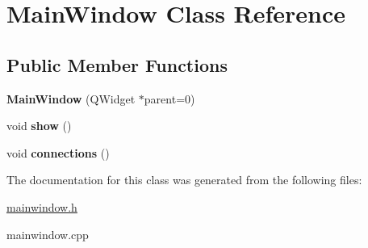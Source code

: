 \hypertarget{classMainWindow}{\section{\-Main\-Window \-Class \-Reference}
\label{classMainWindow}
}
\subsection*{\-Public \-Member \-Functions}
\begin{DoxyCompactItemize}
\item 
\hypertarget{classMainWindow_a8b244be8b7b7db1b08de2a2acb9409db}{{\bfseries \-Main\-Window} (\-Q\-Widget $\ast$parent=0)}\label{classMainWindow_a8b244be8b7b7db1b08de2a2acb9409db}

\item 
\hypertarget{classMainWindow_ae3d7a4598609a86e8bd317c0d85c4495}{void {\bfseries show} ()}\label{classMainWindow_ae3d7a4598609a86e8bd317c0d85c4495}

\item 
\hypertarget{classMainWindow_a430b81b3bb84b8561b4e63fe76e28c39}{void {\bfseries connections} ()}\label{classMainWindow_a430b81b3bb84b8561b4e63fe76e28c39}

\end{DoxyCompactItemize}


\-The documentation for this class was generated from the following files\-:\begin{DoxyCompactItemize}
\item 
\hyperlink{mainwindow_8h}{mainwindow.\-h}\item 
mainwindow.\-cpp\end{DoxyCompactItemize}
